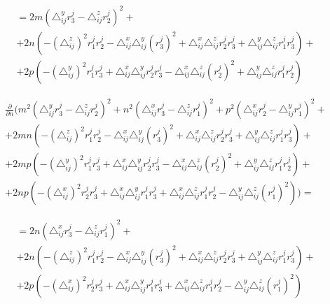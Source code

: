 $$\begin{gathered}
	= 2 m \left( \triangle_{ij}^y r_3^j - \triangle_{ij}^z r_2^j \right)^2 + \\
	+ 2 n \left( - \left( \triangle_{ij}^z \right)^2 r_1^j r_2^j - \triangle_{ij}^x \triangle_{ij}^y (r_3^j)^2 + \triangle_{ij}^x  \triangle_{ij}^z r_2^j r_3^j + \triangle_{ij}^y  \triangle_{ij}^z r_1^j r_3^j \right) + \\
	+ 2 p \left( - \left( \triangle_{ij}^y\right)^2 r_1^j r_3^j +  \triangle_{ij}^x \triangle_{ij}^y r_2^j r_3^j -  \triangle_{ij}^x  \triangle_{ij}^z (r_2^j)^2 +  \triangle_{ij}^y  \triangle_{ij}^z r_1^j r_2^j \right) 
\end{gathered}$$

\vspace{0.5cm}
$$\begin{gathered}
	\frac{\partial}{\partial n} \bigg( m^2 \left( \triangle_{ij}^y r_3^j - \triangle_{ij}^z r_2^j \right)^2 
	+ n^2 \left( \triangle_{ij}^x r_3^j - \triangle_{ij}^z r_1^j \right)^2
	+ p^2 \left( \triangle_{ij}^x r_2^j - \triangle_{ij}^y r_1^j \right)^2 + \\
	+ 2 m n \left( - \left( \triangle_{ij}^z \right)^2 r_1^j r_2^j - \triangle_{ij}^x \triangle_{ij}^y (r_3^j)^2 + \triangle_{ij}^x  \triangle_{ij}^z r_2^j r_3^j + \triangle_{ij}^y  \triangle_{ij}^z r_1^j r_3^j \right) + \\
	+ 2 m p \left( - \left( \triangle_{ij}^y\right)^2 r_1^j r_3^j +  \triangle_{ij}^x \triangle_{ij}^y r_2^j r_3^j -  \triangle_{ij}^x  \triangle_{ij}^z (r_2^j)^2 +  \triangle_{ij}^y  \triangle_{ij}^z r_1^j r_2^j \right) + \\
	+ 2 n p \left( - \left(\triangle_{ij}^x\right)^2 r_2^j r_3^j +  \triangle_{ij}^x \triangle_{ij}^y r_1^j r_3^j +  \triangle_{ij}^x  \triangle_{ij}^z r_1^j r_2^j -  \triangle_{ij}^y  \triangle_{ij}^z (r_1^j)^2 \right) \bigg) = 
\end{gathered}$$

$$\begin{gathered}
	= 2 n \left( \triangle_{ij}^x r_3^j - \triangle_{ij}^z r_1^j \right)^2 + \\
	+ 2 n \left( - \left( \triangle_{ij}^z \right)^2 r_1^j r_2^j - \triangle_{ij}^x \triangle_{ij}^y (r_3^j)^2 + \triangle_{ij}^x  \triangle_{ij}^z r_2^j r_3^j + \triangle_{ij}^y  \triangle_{ij}^z r_1^j r_3^j \right) + \\
	+ 2 p \left( - \left(\triangle_{ij}^x\right)^2 r_2^j r_3^j +  \triangle_{ij}^x \triangle_{ij}^y r_1^j r_3^j +  \triangle_{ij}^x  \triangle_{ij}^z r_1^j r_2^j -  \triangle_{ij}^y  \triangle_{ij}^z (r_1^j)^2 \right)
\end{gathered}$$

